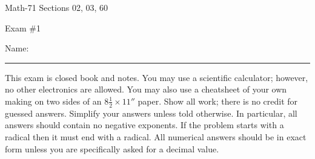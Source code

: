 \documentclass[letterpaper,12pt,fleqn]{article}
\begin{document}
\begin{center}
  \large
  Math-71 Sections 02, 03, 60

  \Large
  Exam \#1
\end{center}

\vspace{0.5in}

Name: \rule{4in}{1pt}

\vspace{0.5in}

This exam is closed book and notes. You may use a scientific calculator; however, no other electronics are allowed.
You may also use a cheatsheet of your own making on two sides of an \(8\frac{1}{2}\times11''\) paper.  Show all
work; there is no credit for guessed answers.  Simplify your answers unless told otherwise.  In particular, all
answers should contain no negative exponents.  If the problem starts with a radical then it must end with a
radical.  All numerical answers should be in exact form unless you are specifically asked for a decimal value.

\vspace{0.5in}
\end{document}
